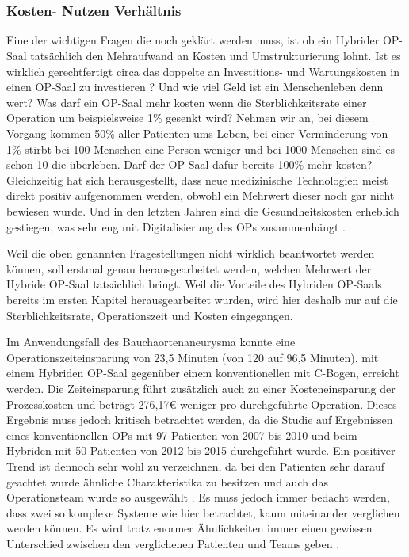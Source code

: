 \chapter{}
\label{sec:overview}

\subsection{Kosten- Nutzen Verhältnis}

Eine der wichtigen Fragen die noch geklärt werden muss, ist ob ein Hybrider OP-Saal tatsächlich den Mehraufwand an Kosten und Umstrukturierung lohnt. 
Ist es wirklich gerechtfertigt circa das doppelte an Investitions- und Wartungskosten in einen OP-Saal zu investieren \cite{ORofTheFuture}? Und wie viel Geld ist ein Menschenleben denn wert? Was darf ein OP-Saal mehr kosten wenn die Sterblichkeitsrate einer Operation um beispielsweise 1\% gesenkt wird? Nehmen wir an, bei diesem Vorgang kommen 50\% aller Patienten ums Leben, bei einer Verminderung von 1\% stirbt bei 100 Menschen eine Person weniger und bei 1000 Menschen sind es schon 10 die überleben. Darf der OP-Saal dafür bereits 100\% mehr kosten?
Gleichzeitig hat sich herausgestellt, dass neue medizinische Technologien meist direkt positiv aufgenommen werden, obwohl ein Mehrwert dieser noch gar nicht bewiesen wurde. Und in den letzten Jahren sind die Gesundheitskosten erheblich gestiegen, was sehr eng mit Digitalisierung des OPs zusammenhängt \cite{DerDigitaleOperationssaal}.

Weil die oben genannten Fragestellungen nicht wirklich beantwortet werden können, soll erstmal genau herausgearbeitet werden, welchen Mehrwert der Hybride OP-Saal tatsächlich bringt. Weil die Vorteile des Hybriden OP-Saals bereits im ersten Kapitel herausgearbeitet wurden, wird hier deshalb nur auf die Sterblichkeitsrate, Operationszeit und Kosten eingegangen.

Im Anwendungsfall des Bauchaortenaneurysma konnte eine Operationszeiteinsparung von 23,5 Minuten (von 120 auf 96,5 Minuten), mit einem Hybriden OP-Saal gegenüber einem konventionellen mit C-Bogen, erreicht werden. Die Zeiteinsparung führt zusätzlich auch zu einer Kosteneinsparung der Prozesskosten und beträgt 276,17€ weniger pro durchgeführte Operation.
Dieses Ergebnis muss jedoch kritisch betrachtet werden, da die Studie auf Ergebnissen eines konventionellen OPs mit 97 Patienten von 2007 bis 2010 und beim Hybriden mit 50 Patienten von 2012 bis 2015 durchgeführt wurde. Ein positiver Trend ist dennoch sehr wohl zu verzeichnen, da bei den Patienten sehr darauf geachtet wurde ähnliche Charakteristika zu besitzen und auch das Operationsteam wurde so ausgewählt \cite{HybriderVsKonventioneller}.
Es muss jedoch immer bedacht werden, dass zwei so komplexe Systeme wie hier betrachtet, kaum miteinander verglichen werden können. Es wird trotz enormer Ähnlichkeiten immer einen gewissen Unterschied zwischen den verglichenen Patienten und Teams geben \cite{DerDigitaleOperationssaal}.

